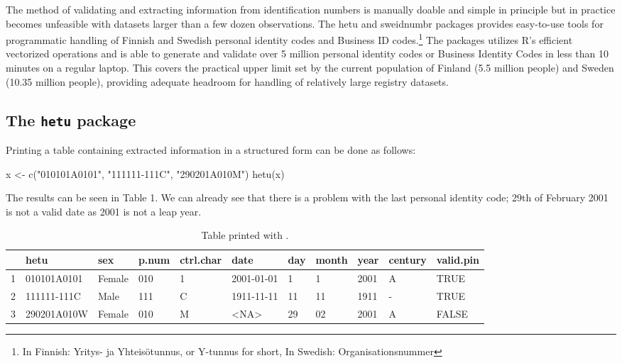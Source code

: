 The method of validating and extracting information from identification numbers is manually doable and simple in principle but in practice becomes unfeasible with datasets larger than a few dozen observations. The hetu and sweidnumbr packages provides easy-to-use tools for programmatic handling of Finnish and Swedish personal identity codes and Business ID codes.\footnote{In Finnish: Yritys- ja Yhteisötunnus, or Y-tunnus for short, In Swedish: Organisationsnummer} The packages utilizes R’s efficient vectorized operations and is able to generate and validate over 5 million personal identity codes or Business Identity Codes in less than 10 minutes on a regular laptop. This covers the practical upper limit set by the current population of Finland (5.5 million people) and Sweden (10.35 million people), providing adequate headroom for handling of relatively large registry datasets.

\subsection{The \texttt{hetu} package}

Printing a table containing extracted information in a structured form can be done as follows:

\begin{example}
  x <- c("010101A0101", "111111-111C", "290201A010M")
  hetu(x)
\end{example}

The results can be seen in Table 1. We can already see that there is a problem with the last personal identity code; 29th of February 2001 is not a valid date as 2001 is not a leap year.

\begin{table}[ht]
\centering
\begin{tabular}{rllllllllll}
\toprule
    & hetu & sex & p.num & ctrl.char & date & day & month & year & century & valid.pin \\
  \hline
  1 & 010101A0101 & Female & 010 & 1 & 2001-01-01 & 1 & 1 & 2001 & A & TRUE \\
  2 & 111111-111C & Male & 111 & C &  1911-11-11 & 11 & 11 & 1911 & - & TRUE \\
  3 & 290201A010W & Female & 010 & M & <NA> & 29 & 02 & 2001 & A & FALSE \\
\bottomrule
\end{tabular}
\caption{Table printed with .}
\label{tab:hetuprintout}
\end{table}

